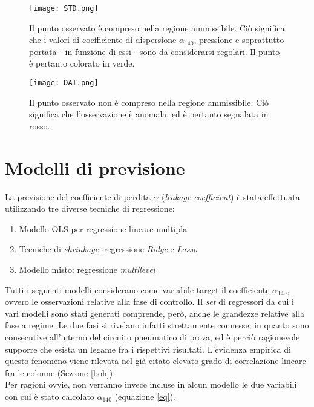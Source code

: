 \documentclass[fleqn,10pt]{SelfArx} %
\begin{document}
\begin{figure}[h]
    \centering
    \texttt{[image: STD.png]}
    \label{fig:em}
    \caption{Il punto osservato è compreso nella regione ammissibile. Ciò significa che i valori di coefficiente di dispersione $\alpha_{140}$, pressione e soprattutto portata - in funzione di essi - sono da considerarsi regolari. Il punto è pertanto colorato in verde.}
\end{figure}
\begin{figure}[h]
    \centering
    \texttt{[image: DAI.png]}
    \label{fig:em}
    \caption{Il punto osservato non è compreso nella regione ammissibile. Ciò significa che l'osservazione è anomala, ed è pertanto segnalata in rosso.}
\end{figure}
\section{Modelli di previsione}\label{Mod}
La previsione del coefficiente di perdita $\alpha$ (\textit{leakage coefficient}) è stata effettuata utilizzando tre diverse tecniche di regressione: 
\begin{enumerate}
    \item Modello OLS per regressione lineare multipla
    \item Tecniche di \textit{shrinkage}: regressione \textit{Ridge} e \textit{Lasso}
    \item Modello misto: regressione \textit{multilevel}
\end{enumerate}
Tutti i seguenti modelli considerano come variabile target il coefficiente $\alpha_{140}$, ovvero le osservazioni relative alla fase di controllo. Il \textit{set} di regressori da cui i vari modelli sono stati generati comprende, però, anche le grandezze relative alla fase a regime. Le due fasi si rivelano infatti strettamente connesse, in quanto sono consecutive all'interno del circuito pneumatico di prova, ed è perciò ragionevole supporre che esista un legame fra i rispettivi risultati. L'evidenza empirica di questo fenomeno viene rilevata nel già citato elevato grado di correlazione lineare fra le colonne (Sezione \ref{boh}).\\
Per ragioni ovvie, non verranno invece incluse in alcun modello le due variabili con cui è stato calcolato $\alpha_{140}$ (equazione \ref{eq}).
\end{document}
